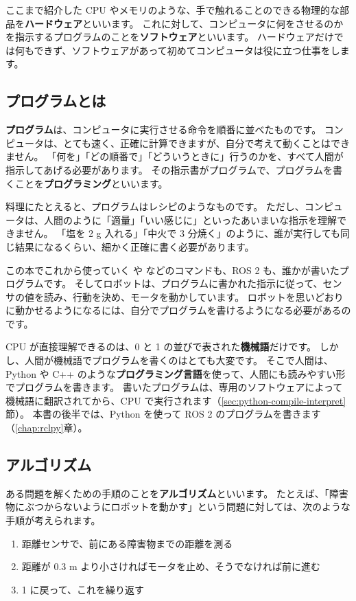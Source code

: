 ここまで紹介した CPU やメモリのような、手で触れることのできる物理的な部品を\textbf{ハードウェア}といいます。
これに対して、コンピュータに何をさせるのかを指示するプログラムのことを\textbf{ソフトウェア}といいます。
ハードウェアだけでは何もできず、ソフトウェアがあって初めてコンピュータは役に立つ仕事をします。

\subsection{プログラムとは}

\textbf{プログラム}は、コンピュータに実行させる命令を順番に並べたものです。
コンピュータは、とても速く、正確に計算できますが、自分で考えて動くことはできません。
「何を」「どの順番で」「どういうときに」行うのかを、すべて人間が指示してあげる必要があります。
その指示書がプログラムで、プログラムを書くことを\textbf{プログラミング}といいます。

料理にたとえると、プログラムはレシピのようなものです。
ただし、コンピュータは、人間のように「適量」「いい感じに」といったあいまいな指示を理解できません。
「塩を 2 g 入れる」「中火で 3 分焼く」のように、誰が実行しても同じ結果になるくらい、細かく正確に書く必要があります。

この本でこれから使っていく  や  などのコマンドも、ROS 2 も、誰かが書いたプログラムです。
そしてロボットは、プログラムに書かれた指示に従って、センサの値を読み、行動を決め、モータを動かしています。
ロボットを思いどおりに動かせるようになるには、自分でプログラムを書けるようになる必要があるのです。

CPU が直接理解できるのは、0 と 1 の並びで表された\textbf{機械語}だけです。
しかし、人間が機械語でプログラムを書くのはとても大変です。
そこで人間は、Python や C++ のような\textbf{プログラミング言語}を使って、人間にも読みやすい形でプログラムを書きます。
書いたプログラムは、専用のソフトウェアによって機械語に翻訳されてから、CPU で実行されます（\ref{sec:python-compile-interpret}節）。
本書の後半では、Python を使って ROS 2 のプログラムを書きます（\ref{chap:rclpy}章）。

\subsection{アルゴリズム}

ある問題を解くための手順のことを\textbf{アルゴリズム}といいます。
たとえば、「障害物にぶつからないようにロボットを動かす」という問題に対しては、次のような手順が考えられます。

\begin{enumerate}
  \item 距離センサで、前にある障害物までの距離を測る
  \item 距離が 0.3 m より小さければモータを止め、そうでなければ前に進む
  \item 1 に戻って、これを繰り返す
\end{enumerate}

